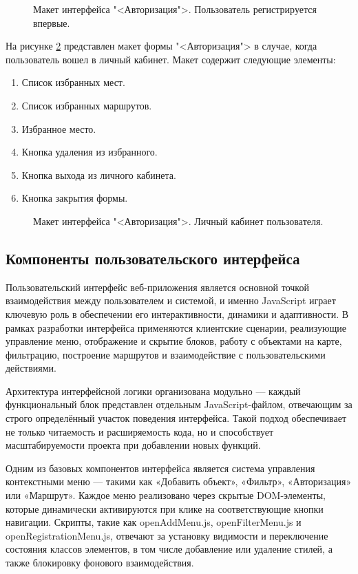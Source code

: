 \vspace{+40mm}
\begin{figure}[ht]
	\center{\texttt{[image: gr8]}}
	\caption{Макет интерфейса "<Авторизация">. Пользователь регистрируется впервые.}
	\label{gr8:image}
\end{figure}

На рисунке \ref{gr9:image} представлен макет формы "<Авторизация"> в случае, когда пользователь вошел в личный кабинет. Макет содержит следующие элементы:

\begin{enumerate}
	\item Список избранных мест.
	\item Список избранных маршрутов.
	\item Избранное место.
	\item Кнопка удаления из избранного.
	\item Кнопка выхода из личного кабинета.
	\item Кнопка закрытия формы.
\end{enumerate}

\begin{figure}[ht]
	\center{\texttt{[image: gr9]}}
	\caption{Макет интерфейса "<Авторизация">. Личный кабинет пользователя.}
	\label{gr9:image}
\end{figure}

\subsection{Компоненты пользовательского интерфейса}

Пользовательский интерфейс веб-приложения является основной точкой взаимодействия между пользователем и системой, и именно JavaScript играет ключевую роль в обеспечении его интерактивности, динамики и адаптивности\cite{b21}. В рамках разработки интерфейса применяются клиентские сценарии, реализующие управление меню, отображение и скрытие блоков, работу с объектами на карте, фильтрацию, построение маршрутов и взаимодействие с пользовательскими действиями.

Архитектура интерфейсной логики организована модульно — каждый функциональный блок представлен отдельным JavaScript-файлом, отвечающим за строго определённый участок поведения интерфейса. Такой подход обеспечивает не только читаемость и расширяемость кода, но и способствует масштабируемости проекта при добавлении новых функций.

Одним из базовых компонентов интерфейса\cite{b22} является система управления контекстными меню — такими как «Добавить объект», «Фильтр», «Авторизация» или «Маршрут». Каждое меню реализовано через скрытые DOM-элементы, которые динамически активируются при клике на соответствующие кнопки навигации. Скрипты, такие как openAddMenu.js, openFilterMenu.js и openRegistrationMenu.js, отвечают за установку видимости и переключение состояния классов элементов, в том числе добавление или удаление стилей, а также блокировку фонового взаимодействия.

